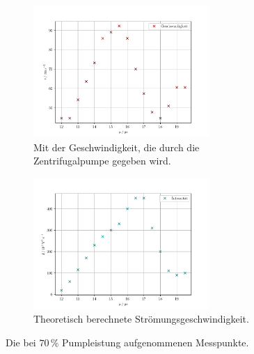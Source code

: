 \begin{figure}
    \centering
    \begin{subfigure}{0.48\textwidth}
        \centering
        \includegraphics[height=5.0cm]{plots/70velocity.pdf}
        \caption{Mit der Geschwindigkeit, die durch die Zentrifugalpumpe gegeben wird.}
        \label{fig:70velo}
    \end{subfigure}
    \begin{subfigure}{0.48\textwidth}
        \centering
        \includegraphics[height=5.0cm]{plots/70intensity.pdf}
        \caption{Theoretisch berechnete Strömungsgeschwindigkeit.}
        \label{fig:70inten}
    \end{subfigure}
    \caption{Die bei $70\,\%$ Pumpleistung aufgenommenen Messpunkte.}
    \label{fig:70vi}
\end{figure}